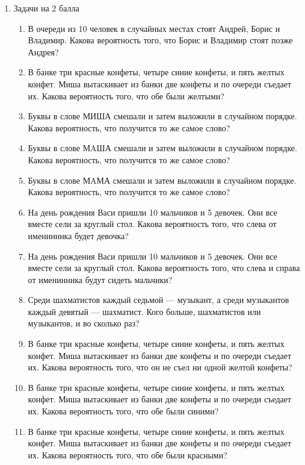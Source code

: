 \documentclass[12pt]{article} %
\begin{document}
\begin{enumerate}
\begin{enumerate}
\newpage



\end{enumerate}

\item Задачи на 2 балла

\begin{enumerate}
  \setlength\itemsep{2em}

  \item В очереди из 10 человек в случайных местах стоят Андрей, Борис и Владимир. Какова вероятность того, что Борис и Владимир стоят позже Андрея?
  \item В банке три красные конфеты, четыре синие конфеты, и пять желтых конфет. Миша вытаскивает из банки две конфеты и по очереди съедает их. Какова вероятность того, что обе были желтыми?
  \item Буквы в слове МИША смешали и затем выложили в случайном порядке. Какова вероятность, что получится то же самое слово?
  \item Буквы в слове МAША смешали и затем выложили в случайном порядке. Какова вероятность, что получится то же самое слово?
  \item Буквы в слове МAМА смешали и затем выложили в случайном порядке. Какова вероятность, что получится то же самое слово?
  \item На день рождения Васи пришли 10 мальчиков и 5 девочек. Они все вместе сели за круглый стол. Какова вероятность того, что слева от именинника будет девочка?
  \item На день рождения Васи пришли 10 мальчиков и 5 девочек. Они все вместе сели за круглый стол. Какова вероятность того, что слева и справа от именинника будут сидеть мальчики?
  \item Среди шахматистов каждый седьмой — музыкант, а среди музыкантов каждый девятый — шахматист. Кого больше, шахматистов или музыкантов, и во сколько раз?
  \item В банке три красные конфеты, четыре синие конфеты, и пять желтых конфет. Миша вытаскивает из банки две конфеты и по очереди съедает их. Какова вероятность того, что он не съел ни одной желтой конфеты?

  \item В банке три красные конфеты, четыре синие конфеты, и пять желтых конфет. Миша вытаскивает из банки две конфеты и по очереди съедает их. Какова вероятность того, что обе были синими?

  \item В банке три красные конфеты, четыре синие конфеты, и пять желтых конфет. Миша вытаскивает из банки две конфеты и по очереди съедает их. Какова вероятность того, что обе были красными?


\end{enumerate}
\end{enumerate}
\end{document}
